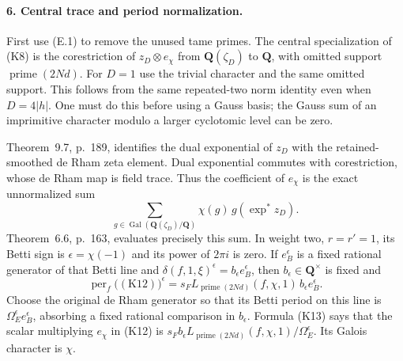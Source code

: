\paragraph{6. Central trace and period normalization.}
First use (E.1) to remove the unused tame primes. The central
specialization of (K8) is the corestriction of $z_D\otimes e_\chi$
from $\mathbf Q(\zeta_D)$ to $\mathbf Q$, with omitted support
$\operatorname{prime}(2Nd)$. For $D=1$ use the trivial character
and the same omitted support. This follows from the same repeated-two
norm identity even when $D=4|h|$. One must do this before using a
Gauss basis; the Gauss sum of an imprimitive character modulo a
larger cyclotomic level can be zero.

Theorem~9.7, p.~189, identifies the dual exponential of $z_D$ with
the retained-smoothed de Rham zeta element. Dual exponential commutes
with corestriction, whose de Rham map is field trace. Thus the
coefficient of $e_\chi$ is the exact unnormalized sum
\[
                    \sum_{g\in\operatorname{Gal}(\mathbf Q(\zeta_D)/\mathbf Q)}
                       \chi(g)\,g(\exp^*z_D).             \tag{K12}
\]
Theorem~6.6, p.~163, evaluates precisely this sum. In weight two,
$r=r'=1$, its Betti sign is $\epsilon=\chi(-1)$ and its power of
$2\pi i$ is zero. If $e_B^\epsilon$ is a fixed rational generator
of that Betti line and
$\delta(f,1,\xi)^\epsilon=b_\epsilon e_B^\epsilon$, then
$b_\epsilon\in\mathbf Q^\times$ is fixed and
\[
     \operatorname{per}_f\bigl((\text{K12})\bigr)^\epsilon
          =s_F L_{\operatorname{prime}(2Nd)}(f,\chi,1)\,
                        b_\epsilon e_B^\epsilon.          \tag{K13}
\]
Choose the original de Rham generator so that its Betti period
on this line is $\Omega_E^\epsilon e_B^\epsilon$, absorbing a
fixed rational comparison in $b_\epsilon$. Formula (K13) says
that the scalar multiplying $e_\chi$ in (K12) is
$s_F b_\epsilon L_{\operatorname{prime}(2Nd)}(f,\chi,1)/
\Omega_E^\epsilon$. Its Galois character is $\chi$.

